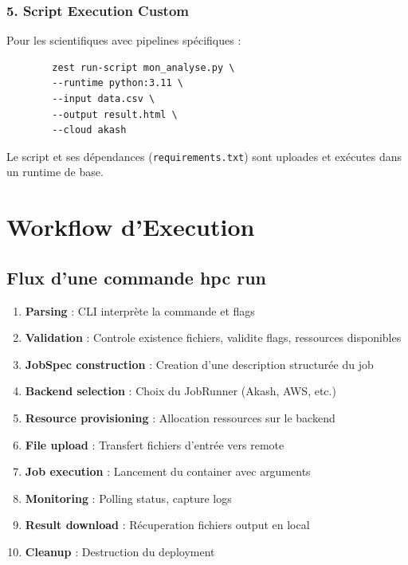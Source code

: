 \documentclass[11pt,a4paper]{article}
\begin{document}
	\subsubsection{5. Script Execution Custom}
	
	Pour les scientifiques avec pipelines spécifiques :
	
	\begin{lstlisting}
		zest run-script mon_analyse.py \
		--runtime python:3.11 \
		--input data.csv \
		--output result.html \
		--cloud akash
	\end{lstlisting}
	
	Le script et ses dépendances (\texttt{requirements.txt}) sont uploades et exécutes dans un runtime de base.
	
	\newpage
	
	\section{Workflow d'Execution}
	
	\subsection{Flux d'une commande hpc run}
	
	\begin{enumerate}
		\item \textbf{Parsing} : CLI interprète la commande et flags
		
		\item \textbf{Validation} : Controle existence fichiers, validite flags, ressources disponibles
		
		\item \textbf{JobSpec construction} : Creation d'une description structurée du job
		
		\item \textbf{Backend selection} : Choix du JobRunner (Akash, AWS, etc.)
		
		\item \textbf{Resource provisioning} : Allocation ressources sur le backend
		
		\item \textbf{File upload} : Transfert fichiers d'entrée vers remote
		
		\item \textbf{Job execution} : Lancement du container avec arguments
		
		\item \textbf{Monitoring} : Polling status, capture logs
		
		\item \textbf{Result download} : Récuperation fichiers output en local
		
		\item \textbf{Cleanup} : Destruction du deployment
	\end{enumerate}
	
\end{document}
